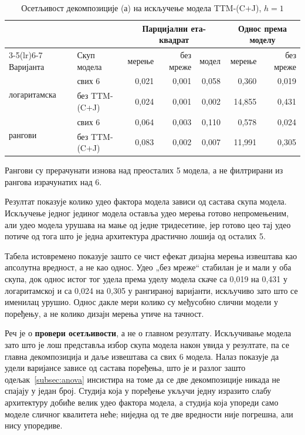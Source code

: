 \begin{table}[htbp]
\centering
\caption{Осетљивост декомпозиције (а) на искључење модела TTM-(C+J), $h = 1$}
\label{tab:anova-sens}
\small
\begin{tabular}{llrrrrr}
\toprule
& & \multicolumn{3}{c}{Парцијални ета-квадрат} & \multicolumn{2}{c}{Однос према моделу} \\
\cmidrule(lr){3-5}\cmidrule(lr){6-7}
Варијанта & Скуп модела & мерење & без мреже & модел & мерење & без мреже \\
\midrule
\multirow{2}{*}{логаритамска}
 & свих 6  & 0,021 & 0,001 & 0,058 & 0,360 & 0,019 \\
 & без TTM-(C+J) & 0,024 & 0,001 & 0,002 & 14,855 & 0,431 \\
\midrule
\multirow{2}{*}{рангови}
 & свих 6  & 0,064 & 0,003 & 0,110 & 0,578 & 0,024 \\
 & без TTM-(C+J) & 0,083 & 0,002 & 0,007 & 11,991 & 0,305 \\
\bottomrule
\end{tabular}

\vspace{0.4em}
{\footnotesize Рангови су прерачунати изнова над преосталих 5 модела, а не филтрирани
из рангова израчунатих над 6.\par}
\end{table}

Резултат показује колико удео фактора модела зависи од састава скупа модела. Искључење
једног јединог модела оставља удео мерења готово непромењеним, али удео модела урушава
на мање од једне тридесетине, јер готово цео тај удео потиче од тога што је једна
архитектура драстично лошија од осталих 5.

Табела истовремено показује зашто се чист ефекат дизајна мерења извештава као апсолутна
вредност, а не као однос. Удео „без мреже“ стабилан је и мали у оба скупа, док однос
истог тог удела према уделу модела скаче са 0,019 на 0,431 у логаритамској и са 0,024 на
0,305 у рангираној варијанти, искључиво зато што се именилац урушио. Однос дакле мери
колико су међусобно слични модели у поређењу, а не колико дизајн мерења утиче на
тачност.

Реч је о \textbf{провери осетљивости}, а не о главном резултату. Искључивање модела зато
што је лош представља избор скупа модела након увида у резултате, па се главна
декомпозиција и даље извештава са свих 6 модела. Налаз показује да удели варијансе
зависе од састава поређења, што је и разлог зашто одељак~\ref{subsec:anova} инсистира на
томе да се две декомпозиције никада не спајају у један број. Студија која у поређење
укључи једну изразито слабу архитектуру добиће велик удео фактора модела, а студија која
упореди само моделе сличног квалитета неће; ниједна од те две вредности није погрешна,
али нису упоредиве.


